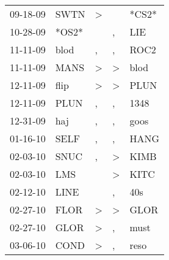 \begin{supertabular}{p{0.07\textwidth}p{0.06\textwidth}p{0.02\textwidth}p{0.02\textwidth}p{0.06\textwidth}}
          09-18-09\textsuperscript{} &           SWTN\textsuperscript{} &     \textgreater &                  &                            *CS2* \\
          10-28-09\textsuperscript{} &                            *OS2* &                  &                , &            LIE\textsuperscript{} \\
          11-11-09\textsuperscript{} &           blod\textsuperscript{} &                , &                , &           ROC2\textsuperscript{} \\
          11-11-09\textsuperscript{} &           MANS\textsuperscript{} &     \textgreater &     \textgreater &           blod\textsuperscript{} \\
          12-11-09\textsuperscript{} &           flip\textsuperscript{} &     \textgreater &     \textgreater &           PLUN\textsuperscript{} \\
          12-11-09\textsuperscript{} &           PLUN\textsuperscript{} &                , &                , &           1348\textsuperscript{} \\
          12-31-09\textsuperscript{} &            haj\textsuperscript{} &                , &                , &           goos\textsuperscript{} \\
          01-16-10\textsuperscript{} &           SELF\textsuperscript{} &                , &                , &           HANG\textsuperscript{} \\
          02-03-10\textsuperscript{} &           SNUC\textsuperscript{} &                , &     \textgreater &           KIMB\textsuperscript{} \\
          02-03-10\textsuperscript{} &            LMS\textsuperscript{} &                  &     \textgreater &           KITC\textsuperscript{} \\
          02-12-10\textsuperscript{} &           LINE\textsuperscript{} &                  &                , &            40s\textsuperscript{} \\
          02-27-10\textsuperscript{} &           FLOR\textsuperscript{} &     \textgreater &     \textgreater &           GLOR\textsuperscript{} \\
          02-27-10\textsuperscript{} &           GLOR\textsuperscript{} &     \textgreater &                , &           must\textsuperscript{} \\
          03-06-10\textsuperscript{} &           COND\textsuperscript{} &     \textgreater &                , &           reso\textsuperscript{} \\

\end{supertabular}
